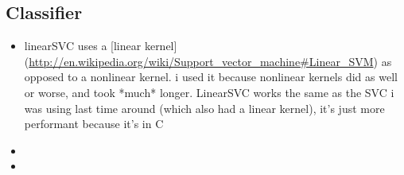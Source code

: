 \subsection{Classifier}

\begin{itemize}
  \item linearSVC uses a [linear kernel](\url{http://en.wikipedia.org/wiki/Support_vector_machine#Linear_SVM}) as opposed to a nonlinear kernel. i used it because nonlinear kernels did as well or worse, and took *much* longer. LinearSVC works the same as the SVC i was using last time around (which also had a linear kernel), it's just more performant because it's in C
  \item 
  \item 
\end{itemize}

